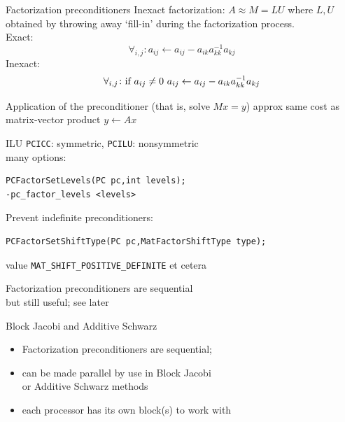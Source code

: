 \begin{longstory}
\begin{numberedframe}{Factorization preconditioners}
Inexact factorization: $A\approx M=LU$ where $L,U$
obtained by throwing away `fill-in' during the factorization process.\\
Exact:
\[ \forall_{i,j}\colon a_{ij}\leftarrow a_{ij}-a_{ik}a_{kk}^{-1}a_{kj} \]
Inexact:
\[ \forall_{i,j}\colon \hbox{if $a_{ij}\not=0$ }
   a_{ij}\leftarrow a_{ij}-a_{ik}a_{kk}^{-1}a_{kj} \]

Application of the preconditioner (that is, solve $Mx=y$)
approx same cost as matrix-vector product $y\leftarrow Ax$
\end{numberedframe}

\begin{numberedframe}{ILU}
\lstinline{PCICC}: symmetric, \lstinline{PCILU}: nonsymmetric\\
many options:
\begin{lstlisting}
PCFactorSetLevels(PC pc,int levels);
-pc_factor_levels <levels>
\end{lstlisting}

Prevent indefinite preconditioners:
\begin{lstlisting}
PCFactorSetShiftType(PC pc,MatFactorShiftType type);
\end{lstlisting}
value \lstinline{MAT_SHIFT_POSITIVE_DEFINITE} et cetera

Factorization preconditioners are sequential\\
but still useful; see later

\end{numberedframe}

\begin{higher}
\begin{numberedframe}{Block Jacobi and Additive Schwarz}
  \begin{itemize}
  \item Factorization preconditioners are sequential;
  \item can be made parallel by use in Block Jacobi\\
    or Additive Schwarz methods
  \item each processor has its own block(s) to work with
  \end{itemize}
\end{numberedframe}


\end{higher}
\end{longstory}
